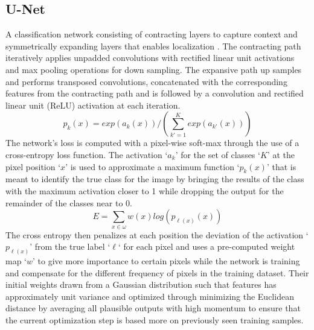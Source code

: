 \documentclass{Configuration_Files/PoliMi3i_thesis}
\begin{document}
\subsection{U-Net}
A classification network consisting of contracting layers to capture context and 
symmetrically expanding layers that enables localization \cite{OlR15}. The contracting path 
iteratively applies unpadded convolutions with rectified linear unit activations and 
max pooling operations for down sampling. The expansive path up samples and 
performs transposed convolutions, concatenated with the corresponding features 
from the contracting path and is followed by a convolution and rectified linear unit 
(ReLU) activation at each iteration. 
\begin{equation} \label{eq:unetact}
p_{k}(x) = exp(a_{k}(x))/(\sum_{k'=1}^K exp(a_{k'}(x)))
\end{equation}
The network’s loss is computed with a pixel-wise soft-max through the use of a cross-entropy 
loss function. The activation ‘$a_{k}$’ for the set of classes ‘$K$’ at the pixel position ‘$x$’ is 
used to approximate a maximum function ‘$p_{k}(x)$’ that is meant to identify the true class for 
the image by bringing the results of the class with the maximum activation closer to 1 
while dropping the output for the remainder of the classes near to 0.
\begin{equation} \label{eq:unetloss}
E = \sum_{x\in\omega} w(x)log(p_{\ell(x)}(x))
\end{equation}
The cross entropy then penalizes at each position the deviation of the activation ‘$p_{\ell(x)}$’ 
from the true label ‘$\ell$‘ for each pixel and uses a pre-computed weight map ‘$w$’ to give more 
importance to certain pixels while the network is training and compensate for the different frequency 
of pixels in the training dataset. Their  initial weights drawn from a Gaussian distribution 
such that features has approximately unit variance and optimized through minimizing the Euclidean 
distance by averaging all plausible outputs with high momentum to ensure that the current optimization 
step is based more on  previously seen training samples.
\end{document}

